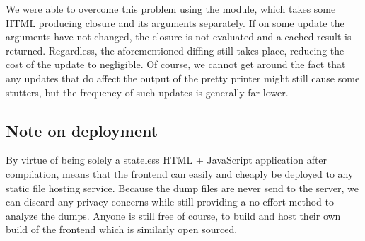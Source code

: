 We were able to overcome this problem using the  module, which takes some HTML producing closure and its arguments
separately. If on some update the arguments have not changed, the closure is not evaluated and a cached result is returned. Regardless,
the aforementioned diffing still takes place, reducing the cost of the update to negligible. Of course, we cannot get around the fact that
any updates that do affect the output of the pretty printer might still cause some stutters, but the frequency of such updates is 
generally far lower.

\subsection{Note on deployment}

By virtue of being solely a stateless HTML + JavaScript application after compilation, means that the frontend can
easily and cheaply be deployed to any static file hosting service. Because the dump files are never send to the server,
we can discard any privacy concerns while still providing a no effort method to analyze the dumps. Anyone is still free
of course, to build and host their own build of the frontend which is similarly open sourced.

